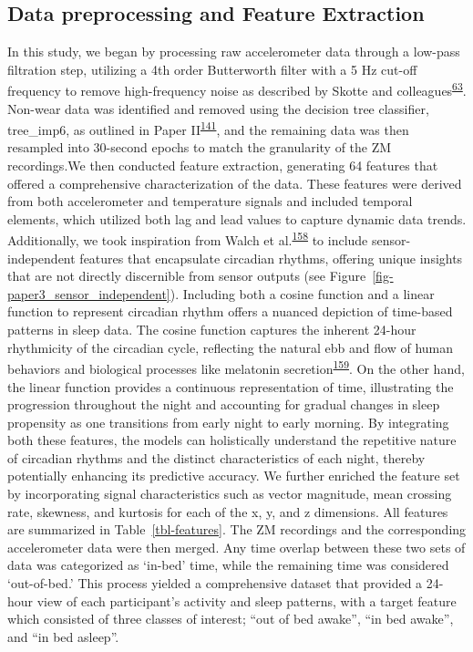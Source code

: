 \documentclass[
  10pt,
]{scrbook}
\begin{document}
\hypertarget{data-preprocessing-and-feature-extraction}{%
\subsection{Data preprocessing and Feature
Extraction}\label{data-preprocessing-and-feature-extraction}}

In this study, we began by processing raw accelerometer data through a
low-pass filtration step, utilizing a 4th order Butterworth filter with
a 5 Hz cut-off frequency to remove high-frequency noise as described by
Skotte and
colleagues\textsuperscript{\protect\hyperlink{ref-skotte_detection_2014}{63}}.
Non-wear data was identified and removed using the decision tree
classifier, \textsf{tree\_imp6}, as outlined in Paper
II\textsuperscript{\protect\hyperlink{ref-skovgaard_generalizability_2023}{141}},
and the remaining data was then resampled into 30-second epochs to match
the granularity of the ZM recordings.We then conducted feature
extraction, generating 64 features that offered a comprehensive
characterization of the data. These features were derived from both
accelerometer and temperature signals and included temporal elements,
which utilized both lag and lead values to capture dynamic data trends.
Additionally, we took inspiration from Walch et
al.\textsuperscript{\protect\hyperlink{ref-walch_sleep_2019}{158}} to
include sensor-independent features that encapsulate circadian rhythms,
offering unique insights that are not directly discernible from sensor
outputs (see Figure~\ref{fig-paper3_sensor_independent}). Including both
a cosine function and a linear function to represent circadian rhythm
offers a nuanced depiction of time-based patterns in sleep data. The
cosine function captures the inherent 24-hour rhythmicity of the
circadian cycle, reflecting the natural ebb and flow of human behaviors
and biological processes like melatonin
secretion\textsuperscript{\protect\hyperlink{ref-lewy_1980}{159}}. On
the other hand, the linear function provides a continuous representation
of time, illustrating the progression throughout the night and
accounting for gradual changes in sleep propensity as one transitions
from early night to early morning. By integrating both these features,
the models can holistically understand the repetitive nature of
circadian rhythms and the distinct characteristics of each night,
thereby potentially enhancing its predictive accuracy. We further
enriched the feature set by incorporating signal characteristics such as
vector magnitude, mean crossing rate, skewness, and kurtosis for each of
the x, y, and z dimensions. All features are summarized in
Table~\ref{tbl-features}. The ZM recordings and the corresponding
accelerometer data were then merged. Any time overlap between these two
sets of data was categorized as `in-bed' time, while the remaining time
was considered `out-of-bed.' This process yielded a comprehensive
dataset that provided a 24-hour view of each participant's activity and
sleep patterns, with a target feature which consisted of three classes
of interest; ``out of bed awake'', ``in bed awake'', and ``in bed
asleep''.
\end{document}
